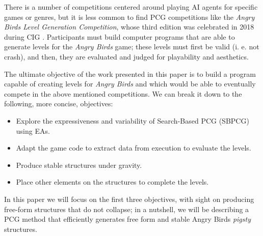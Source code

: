 \documentclass[sigconf]{acmart}
\begin{document}
There is a number of competitions centered around playing AI agents for specific 
games or genres, but it is less common to find PCG competitions like the 
\textit{Angry Birds Level Generation Competition}, whose third edition
was celebrated in 2018 during CIG \cite{aibirds}.
Participants must build 
computer programs that are able to generate levels for the \textit{Angry Birds} 
game; these levels must first be valid (i. e. not crash), and then,
they are evaluated and judged for playability and aesthetics. 

The ultimate objective of the work presented in this paper is to
build a program capable of creating levels for \textit{Angry Birds}
and which would be able to eventually compete in the above mentioned
competitions. We can break it down to the following, more concise,
objectives: 

\begin{itemize}
	\item Explore the expressiveness and variability of Search-Based PCG (SBPCG) using EAs.
	\item Adapt the game code to extract data from execution to 
	evaluate the levels.
	\item Produce stable structures under gravity.
	\item Place other elements on the structures to complete the levels.
\end{itemize} 

In this paper we will focus on the first three objectives, with sight
on producing free-form structures that do not collapse; in a nutshell,
we will be describing a PCG method that efficiently generates free
form and stable Angry Birds {\em pigsty} structures.


\end{document}
